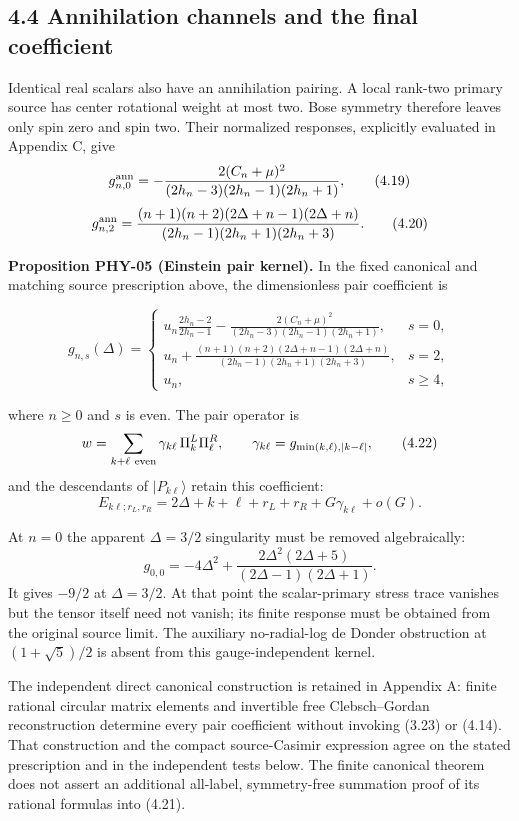 \hypertarget{annihilation-channels-and-the-final-coefficient}{%
\subsection{4.4 Annihilation channels and the final coefficient}\label{annihilation-channels-and-the-final-coefficient}}

Identical real scalars also have an annihilation pairing. A local rank-two primary source has center rotational weight at most two. Bose symmetry therefore leaves only spin zero and spin two. Their normalized responses, explicitly evaluated in Appendix C, give \[
g^{\rm ann}_{n,0}
=-\frac{2(C_n+\mu)^2}
{(2h_n-3)(2h_n-1)(2h_n+1)},
\tag{4.19}
\] \[
g^{\rm ann}_{n,2}
=\frac{(n+1)(n+2)(2\Delta+n-1)(2\Delta+n)}
{(2h_n-1)(2h_n+1)(2h_n+3)} .
\tag{4.20}
\]

\textbf{Proposition PHY-05 (Einstein pair kernel).} In the fixed canonical and matching source prescription above, the dimensionless pair coefficient is

\[
\boxed{
g_{n,s}(\Delta)=
\begin{cases}
\displaystyle
u_n\frac{2h_n-2}{2h_n-1}
-\frac{2(C_n+\mu)^2}
{(2h_n-3)(2h_n-1)(2h_n+1)},&s=0,\\[2mm]
\displaystyle
u_n+
\frac{(n+1)(n+2)(2\Delta+n-1)(2\Delta+n)}
{(2h_n-1)(2h_n+1)(2h_n+3)},&s=2,\\[2mm]
u_n,&s\ge4 ,
\end{cases}
}
\tag{4.21}
\]

where \(n\ge0\) and \(s\) is even. The pair operator is \[
w=\sum_{k+\ell\ {\rm even}}
\gamma_{k\ell}\,\Pi_k^L\Pi_\ell^R,\qquad
\gamma_{k\ell}=g_{\min(k,\ell),|k-\ell|},
\tag{4.22}
\] and the descendants of \(|P_{k\ell}\rangle\) retain this coefficient: \[
E_{k\ell;r_L,r_R}
=2\Delta+k+\ell+r_L+r_R
+G\gamma_{k\ell}+o(G).
\tag{4.23}
\]

At \(n=0\) the apparent \(\Delta=3/2\) singularity must be removed algebraically: \[
g_{0,0}
=-4\Delta^2+
\frac{2\Delta^2(2\Delta+5)}
{(2\Delta-1)(2\Delta+1)} .
\tag{4.24}
\] It gives \(-9/2\) at \(\Delta=3/2\). At that point the scalar-primary stress trace vanishes but the tensor itself need not vanish; its finite response must be obtained from the original source limit. The auxiliary no-radial-log de Donder obstruction at \((1+\sqrt5)/2\) is absent from this gauge-independent kernel.

The independent direct canonical construction is retained in Appendix A: finite rational circular matrix elements and invertible free Clebsch--Gordan reconstruction determine every pair coefficient without invoking (3.23) or (4.14). That construction and the compact source-Casimir expression agree on the stated prescription and in the independent tests below. The finite canonical theorem does not assert an additional all-label, symmetry-free summation proof of its rational formulas into (4.21).

